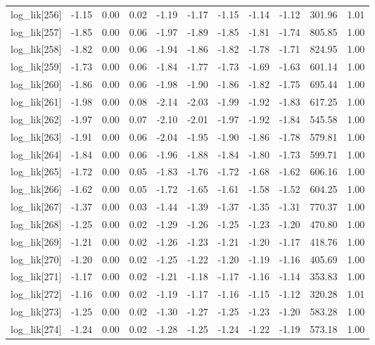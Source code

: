 \begin{table}[ht]
\begin{tabular}{rrrrrrrrrrr}
  log\_lik[256] & -1.15 & 0.00 & 0.02 & -1.19 & -1.17 & -1.15 & -1.14 & -1.12 & 301.96 & 1.01 \\ 
  log\_lik[257] & -1.85 & 0.00 & 0.06 & -1.97 & -1.89 & -1.85 & -1.81 & -1.74 & 805.85 & 1.00 \\ 
  log\_lik[258] & -1.82 & 0.00 & 0.06 & -1.94 & -1.86 & -1.82 & -1.78 & -1.71 & 824.95 & 1.00 \\ 
  log\_lik[259] & -1.73 & 0.00 & 0.06 & -1.84 & -1.77 & -1.73 & -1.69 & -1.63 & 601.14 & 1.00 \\ 
  log\_lik[260] & -1.86 & 0.00 & 0.06 & -1.98 & -1.90 & -1.86 & -1.82 & -1.75 & 695.44 & 1.00 \\ 
  log\_lik[261] & -1.98 & 0.00 & 0.08 & -2.14 & -2.03 & -1.99 & -1.92 & -1.83 & 617.25 & 1.00 \\ 
  log\_lik[262] & -1.97 & 0.00 & 0.07 & -2.10 & -2.01 & -1.97 & -1.92 & -1.84 & 545.58 & 1.00 \\ 
  log\_lik[263] & -1.91 & 0.00 & 0.06 & -2.04 & -1.95 & -1.90 & -1.86 & -1.78 & 579.81 & 1.00 \\ 
  log\_lik[264] & -1.84 & 0.00 & 0.06 & -1.96 & -1.88 & -1.84 & -1.80 & -1.73 & 599.71 & 1.00 \\ 
  log\_lik[265] & -1.72 & 0.00 & 0.05 & -1.83 & -1.76 & -1.72 & -1.68 & -1.62 & 606.16 & 1.00 \\ 
  log\_lik[266] & -1.62 & 0.00 & 0.05 & -1.72 & -1.65 & -1.61 & -1.58 & -1.52 & 604.25 & 1.00 \\ 
  log\_lik[267] & -1.37 & 0.00 & 0.03 & -1.44 & -1.39 & -1.37 & -1.35 & -1.31 & 770.37 & 1.00 \\ 
  log\_lik[268] & -1.25 & 0.00 & 0.02 & -1.29 & -1.26 & -1.25 & -1.23 & -1.20 & 470.80 & 1.00 \\ 
  log\_lik[269] & -1.21 & 0.00 & 0.02 & -1.26 & -1.23 & -1.21 & -1.20 & -1.17 & 418.76 & 1.00 \\ 
  log\_lik[270] & -1.20 & 0.00 & 0.02 & -1.25 & -1.22 & -1.20 & -1.19 & -1.16 & 405.69 & 1.00 \\ 
  log\_lik[271] & -1.17 & 0.00 & 0.02 & -1.21 & -1.18 & -1.17 & -1.16 & -1.14 & 353.83 & 1.00 \\ 
  log\_lik[272] & -1.16 & 0.00 & 0.02 & -1.19 & -1.17 & -1.16 & -1.15 & -1.12 & 320.28 & 1.01 \\ 
  log\_lik[273] & -1.25 & 0.00 & 0.02 & -1.30 & -1.27 & -1.25 & -1.23 & -1.20 & 583.28 & 1.00 \\ 
  log\_lik[274] & -1.24 & 0.00 & 0.02 & -1.28 & -1.25 & -1.24 & -1.22 & -1.19 & 573.18 & 1.00 \\ 

\end{tabular}
\end{table}
